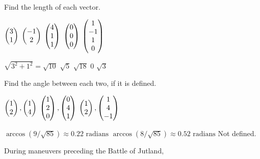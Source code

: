 \begin{exercises}
  \recommended \item
    Find the length of each vector.
    \begin{exparts*}
      \partsitem \( \begin{pmatrix} 3 \\ 1 \end{pmatrix}  \)
      \partsitem \( \begin{pmatrix} -1 \\ 2 \end{pmatrix}  \)
      \partsitem \( \begin{pmatrix} 4 \\ 1 \\ 1 \end{pmatrix}  \)
      \partsitem \( \begin{pmatrix} 0 \\ 0 \\ 0 \end{pmatrix}  \)
      \partsitem \( \begin{pmatrix} 1 \\ -1 \\ 1 \\ 0 \end{pmatrix}  \)
    \end{exparts*}
    \begin{answer}
      \begin{exparts*}
        \partsitem \( \sqrt{3^2+1^2}=\sqrt{10}  \)
        \partsitem \( \sqrt{5}  \)
        \partsitem \( \sqrt{18}  \)
        \partsitem \( 0  \)
        \partsitem \( \sqrt{3}  \)
      \end{exparts*}   
    \end{answer}
  \recommended \item 
    Find the angle between each two, if it is defined.
    \begin{exparts*}
       \partsitem
         \( \begin{pmatrix} 1 \\ 2 \end{pmatrix}, \begin{pmatrix} 1 \\ 4 \end{pmatrix} \)
       \partsitem
         \( \begin{pmatrix} 1 \\ 2 \\ 0 \end{pmatrix}, \begin{pmatrix} 0 \\ 4 \\ 1 \end{pmatrix} \)
       \partsitem
         \( \begin{pmatrix} 1 \\ 2 \end{pmatrix}, \begin{pmatrix} 1 \\ 4 \\ -1 \end{pmatrix} \)
    \end{exparts*}
    \begin{answer}
       \begin{exparts*}
         \partsitem \( \arccos(9/\sqrt{85})\approx 0.22\mbox{\ radians} \)
         \partsitem \( \arccos(8/\sqrt{85})\approx 0.52\mbox{\ radians} \)
         \partsitem Not defined.
      \end{exparts*}      
     \end{answer}
  \recommended \item 
    During maneuvers preceding the Battle of Jutland,

\end{exercises}
